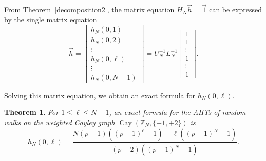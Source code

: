 \documentclass[12pt, leqno]{amsart}
\numberwithin{equation}{section}
\theoremstyle{plain}
\newtheorem{thm}{Theorem}[section]
\theoremstyle{definition}
\newcommand{\ZZ}{\mathbb{Z}}
\newcommand{\0}{\mathbf{0}}
\DeclareMathOperator{\Cay}{Cay}
\begin{document}
From Theorem~\ref{decomposition2}, the matrix equation $H_N \vec{h}=\vec{1}$ can be expressed by the single matrix equation 
\begin{equation*}
\vec{h}=
\begin{bmatrix}
h_N(0,1)\\
h_N(0,2)\\
\vdots\\
h_N(0,\ell)\\
\vdots\\
h_N(0,N-1)
\end{bmatrix}
=U_N^{-1}L_N^{-1}
\begin{bmatrix}
1\\
1\\
\vdots\\
1\\
\vdots\\
1
\end{bmatrix}.
\end{equation*}

Solving this matrix equation, we obtain an exact formula for $h_N(0,\ell)$. 

\begin{thm}\label{thm:+134}
For $1\leq \ell\leq N-1$, an exact formula for the AHTs of random walks on the weighted Cayley graph $\Cay(\ZZ_N,\{+1,+2\})$ is
\[
h_N(0,\ell)=\frac{N(p-1)((p-1)^\ell-1)-\ell((p-1)^N-1)}{(p-2)((p-1)^N-1)}.
\]
\end{thm}
\end{document}
